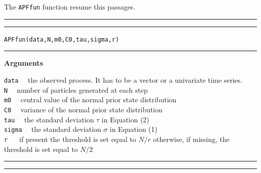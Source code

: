 \documentclass[
]{book}
\theoremstyle{break}
\theoremstyle{nonumberplain}
\begin{document}
The \texttt{APFfun} function resume this passages.\\

\hrule
\hrule
\texttt{APFfun(data,N,m0,C0,tau,sigma,r)}
\hrule

\textbf{Arguments}

\texttt{data} ~~the observed process. It has to be a vector or a
univariate time series.\\
\texttt{N} ~~number of particles generated at each step\\
\texttt{m0} ~~central value of the normal prior state distribution\\
\texttt{C0} ~~variance of the normal prior state distribution\\
\texttt{tau} ~~the standard deviation \(\tau\) in Equation (2)\\
\texttt{sigma} ~~the standard deviation \(\sigma\) in Equation (1)\\
\texttt{r} ~~ if present the threshold is set equal to \(N/r\)
otherwise, if missing, the threshold is set equal to \(N/2\)

\hrule
\hrule
\end{document}
